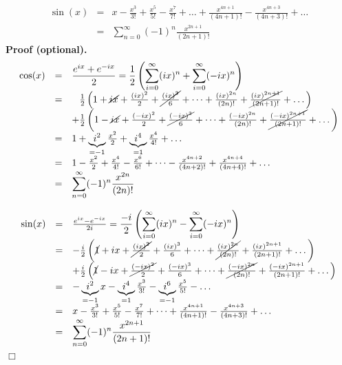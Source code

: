 \documentclass[12pt]{book}
\newenvironment{proofOptional}[1][]{ \textbf{Proof (optional).}}{$\Box$\medskip}
\begin{document}
\begin{equation}\label{eqsinPowerSeries}
\begin{array}{rcl}
\sin(x)&=&x-\frac{x^3}{3!}+\frac{x^5}{5!}-\frac{x^7}{7!}+\dots +\frac{x^{4n+1}}{(4n+1)!}- \frac{x^{4n+3}}{(4n+3)!}+\dots\\
&=& \displaystyle \sum_{n=0}^{\infty}(-1)^n\frac{x^{2n+1}}{(2n+1)!}
\end{array}
\end{equation}
\begin{proofOptional}
\[
\begin{array}{rcl}
\displaystyle\cos(x)&=& \displaystyle \frac{e^{ix}+e^{-ix}}{2}= \frac 12 \left(\sum_{i=0}^\infty (ix)^{n}+ \sum_{i=0}^\infty (-ix)^{n}\right)\\
&=& \phantom{+} \frac12\left( 1+ \cancel{ix} + \frac{(ix)^2}2 +\cancel{\frac{(ix)^3}6}+\dots + \frac{(ix)^{2n}}{(2n)!}+ \cancel{\frac{(ix)^{2n+1}}{(2n+1)!}} +\dots \right)
\\
&&+  \frac12\left( 1-\cancel{ix} + \frac{(-ix)^2}2 +\cancel{\frac{(-ix)^3}6}+\dots + \frac{(-ix)^{2n}}{(2n)!}+ \cancel{\frac{(-ix)^{2n+1}}{(2n+1)!}}+\dots \right)\\
&=& 1+\underbrace{i^2}_{=-1}\frac{x^{2}}2+\underbrace{i^4}_{=1}\frac{x^{4}}{4!}+\dots\\
&=&1-\frac{x^2}{2}+\frac{x^4}{4!}-\frac{x^6}{6!}+\dots -\frac{x^{4n+2}}{(4n+2)!}+ \frac{x^{4n+4}}{(4n+4)!}+\dots\\
&=&\displaystyle \sum_{n=0}^\infty (-1)^n\frac{x^{2n}}{(2n)!}
\end{array}
\]

\[
\begin{array}{rcl}
\displaystyle\sin(x)&=& \frac{e^{ix}-e^{-ix}}{2i}=\displaystyle \frac {-i}{2} \left(\sum_{i=0}^\infty (ix)^{n}- \sum_{i=0}^\infty (-ix)^{n}\right)\\
&=&-\frac{i}{2}\left(\cancel{1} + ix + \cancel{\frac{(ix)^2}2} +{\frac{(ix)^3}6}+\dots + \cancel{\frac{(ix)^{2n}}{(2n)!}}+ {\frac{(ix)^{2n+1}}{(2n+1)!}} +\dots \right)\\
&&+  \frac{i}{2}\left(\cancel{1} -{ix} + \cancel{\frac{(-ix)^2}2} +{\frac{(-ix)^3}6}+\dots + \cancel{\frac{(-ix)^{2n}}{(2n)!}}+ {\frac{(-ix)^{2n+1}}{(2n+1)!}}+\dots \right)\\
&=&- \underbrace{i^2}_{=-1}x-\underbrace{i^4}_{=1}\frac{x^3}{3!}-\underbrace{i^{6}}_{=-1}\frac{x^5}{5!} -\dots\\
&=&x-\frac{x^3}{3!}+\frac{x^5}{5!}-\frac{x^7}{7!}+\dots +\frac{x^{4n+1}}{(4n+1)!}- \frac{x^{4n+3}}{(4n+3)!}+\dots\\
&=&\displaystyle \sum_{n=0}^{\infty}(-1)^n\frac{x^{2n+1}}{(2n+1)!}
\end{array}
\]
\end{proofOptional}
\end{document}
